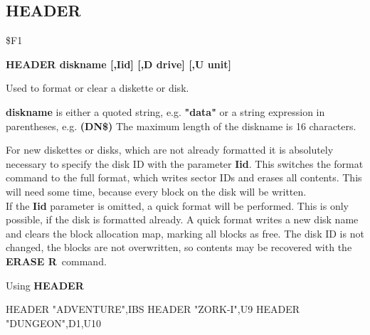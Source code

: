 \subsection{HEADER}
\begin{description}[leftmargin=3cm,style=nextline]
\item [Token:] \$F1
\item [Format:] {\bf HEADER diskname [,Iid] [,D drive] [,U unit] }
\item [Usage:]
   Used to format or clear a diskette
   or disk.

   {\bf diskname} is either a quoted string, e.g. {\bf "data"} or
   a string expression in parentheses, e.g. {\bf (DN\$)}
   The maximum length of the diskname is 16 characters.

   \drivedefinition

   \unitdefinition

\item [Remarks:]
   For new diskettes or disks, which are not already formatted
   it is absolutely necessary to specify the disk ID with the
   parameter {\bf Iid}. This switches the format command to the
   full format, which writes sector IDs and erases all contents.
   This will need some time, because every block on the disk will
   be written. \\
   If the {\bf Iid} parameter is omitted, a quick format will
   be performed. This is only possible, if the disk is formatted
   already. A quick format writes a new disk name and clears the
   block allocation map, marking all blocks as free.
   The disk ID is not changed, the blocks are not overwritten,
   so contents may be recovered with the {\bf ERASE R} command.

\item [Example:] Using {\bf HEADER}
\begin{screenoutput}
  HEADER "ADVENTURE",IBS
  HEADER "ZORK-I",U9
  HEADER "DUNGEON",D1,U10
\end{screenoutput}
\end{description}


\newpage

